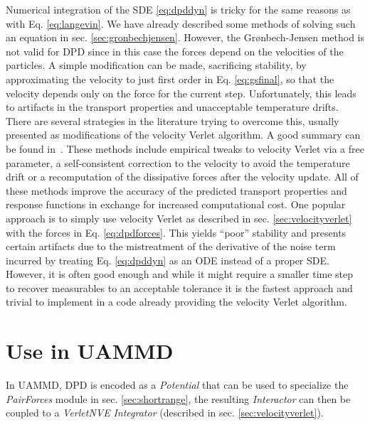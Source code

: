 \documentclass[ twoside,openright,titlepage,numbers=noenddot,%
headinclude,footinclude,cleardoublepage=empty,abstract=on,
BCOR=5mm,paper=b5,fontsize=11pt, dvipsnames
]{scrreprt}
\newcommand{\uammd}{\gls{UAMMD}\xspace}
\begin{document}
Numerical integration of the \gls{SDE} \eqref{eq:dpddyn} is tricky for the same reasons as with Eq. \eqref{eq:langevin}. We have already described some methods of solving such an equation in sec. \ref{sec:gronbechjensen}. However, the Grønbech-Jensen method is not valid for \gls{DPD} since in this case the forces depend on the velocities of the particles. A simple modification can be made, sacrificing stability, by approximating the velocity to just first order in Eq. \eqref{eq:gsfinal}, so that the velocity depends only on the force for the current step. Unfortunately, this leads to artifacts in the transport properties and unacceptable temperature drifts. There are several strategies in the literature trying to overcome this, usually presented as modifications of the velocity Verlet algorithm. A good summary can be found in~\cite{Leimhuler2015}. These methods include empirical tweaks to velocity Verlet via a free parameter\cite{Groot1997}, a self-consistent correction to the velocity to avoid the temperature drift\cite{Pagonabarraga1998} or a recomputation of the dissipative forces after the velocity update\cite{Besold2000}.
All of these methods improve the accuracy of the predicted transport properties and response functions in exchange for increased computational cost. 
One popular approach is to simply use velocity Verlet as described in sec. \ref{sec:velocityverlet} with the forces in Eq. \eqref{eq:dpdforces}. This yields ``poor'' stability and presents certain artifacts\cite{Besold2000} due to the mistreatment of the derivative of the noise term incurred by treating Eq. \eqref{eq:dpddyn} as an \gls{ODE} instead of a proper \gls{SDE}. However, it is often good enough and while it might require a smaller time step to recover measurables to an acceptable tolerance it is the fastest approach and trivial to implement in a code already providing the velocity Verlet algorithm.
\section*{Use in UAMMD}
In \uammd, \gls{DPD} is encoded as a \emph{Potential} that can be used to specialize the \emph{PairForces} module in sec. \ref{sec:shortrange}, the resulting \emph{Interactor} can then be coupled to a \emph{VerletNVE} \emph{Integrator} (described in sec. \ref{sec:velocityverlet}).
\end{document}
